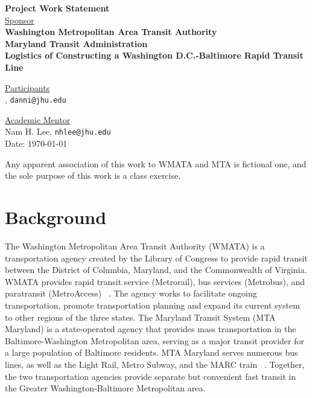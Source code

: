 \documentclass[12pt,letterpaper]{article}
\theoremstyle{definition}
\begin{document}
\def\shiftdowna{0.32in}  %
\def\shiftdownb{0.22in}  %


\begin{center}
\textbf{{\large Project Work Statement}}\\


\vspace \shiftdowna
\underline {Sponsor}\\ 
\vspace{5pt}
\textbf{{\large Washington Metropolitan Area Transit Authority}}\\
\vspace{5pt}
\textbf{{\large Maryland Transit Administration}}\\


\vspace \shiftdowna
\textbf{{\large Logistics of Constructing a Washington D.C.-Baltimore Rapid Transit Line}}


\vspace{0.35in}
\vspace \shiftdownb
\underline {Participants} \\
\vspace{5pt}
, \texttt{danni@jhu.edu}

\vspace \shiftdownb
\underline {Academic Mentor}\\
\vspace{5pt}
Nam H. Lee, \texttt{nhlee@jhu.edu} \\

\vspace \shiftdowna
Date: \today

\end{center}

\vfill  
\footnoterule
\noindent \small{Any apparent association of this work to WMATA and MTA is
fictional one, and the sole purpose of this work is a class exercise.}

\newpage

\section{Background} 
The Washington Metropolitan Area Transit Authority (WMATA) is a transportation agency created by the Library of Congress to provide rapid transit between the District of Columbia, Maryland, and the Commonwealth of Virginia. WMATA provides rapid transit service (Metrorail), bus services (Metrobus), and paratransit (MetroAccess) ~\cite{WMATA}. The agency works to facilitate ongoing transportation, promote transportation planning and expand its current system to other regions of the three states. The Maryland Transit System (MTA Maryland) is a state-operated agency that provides mass transportation in the Baltimore-Washington Metropolitan area, serving as a major transit provider for a large population of Baltimore residents. MTA Maryland serves numerous bus lines, as well as the Light Rail, Metro Subway, and the MARC train ~\cite{MTA}. Together, the two transportation agencies provide separate but convenient fast transit in the Greater Washington-Baltimore Metropolitan area.
\end{document}
